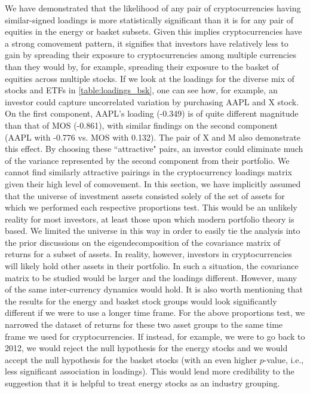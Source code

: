 \documentclass[12pt,twoside]{article}
\begin{document}
We have demonstrated that the likelihood of any pair of cryptocurrencies having similar-signed loadings is more statistically significant than it is for any pair of equities in the energy or basket subsets. Given this implies cryptocurrencies have a strong comovement pattern, it signifies that investors have relatively less to gain by spreading their exposure to cryptocurrencies among multiple currencies than they would by, for example, spreading their exposure to the basket of equities across multiple stocks. If we look at the loadings for the diverse mix of stocks and ETFs in \ref{table:loadings_bsk}, one can see how, for example, an investor could capture uncorrelated variation by purchasing AAPL and X stock. On the first component, AAPL's loading (-0.349) is of quite different magnitude than that of MOS (-0.861), with similar findings on the second component (AAPL with -0.776 vs. MOS with 0.132). The pair of X and M also demonstrate this effect. By choosing these ``attractive" pairs, an investor could eliminate much of the variance represented by the second component from their portfolio. We cannot find similarly attractive pairings in the cryptocurrency loadings matrix given their high level of comovement.
\bigbreak
In this section, we have implicitly assumed that the universe of investment assets consisted solely of the set of assets for which we performed each respective proportions test. This would be an unlikely reality for most investors, at least those upon which modern portfolio theory is based. We limited the universe in this way in order to easily tie the analysis into the prior discussions on the eigendecomposition of the covariance matrix of returns for a subset of assets. In reality, however, investors in cryptocurrencies will likely hold other assets in their portfolio. In such a situation, the covariance matrix to be studied would be larger and the loadings different. However, many of the same inter-currency dynamics would hold. It is also worth mentioning that the results for the energy and basket stock groups would look significantly different if we were to use a longer time frame. For the above proportions test, we narrowed the dataset of returns for these two asset groups to the same time frame we used for cryptocurrencies. If instead, for example, we were to go back to 2012, we would reject the null hypothesis for the energy stocks and we would accept the null hypothesis for the basket stocks (with an even higher $p$-value, i.e., less significant association in loadings). This would lend more credibility to the suggestion that it is helpful to treat energy stocks as an industry grouping.
\end{document}
